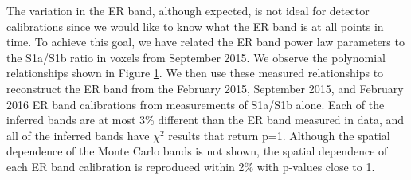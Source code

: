 The variation in the ER band, although expected, is not ideal for detector calibrations since we would like to know what the ER band is at all points in time.  To achieve this goal, we have related the ER band power law parameters to the S1a/S1b ratio in voxels from September 2015.  We observe the polynomial relationships shown in Figure \ref{ERBand_S1aS1bToER}.  We then use these measured relationships to reconstruct the ER band from the February 2015, September 2015, and February 2016 ER band calibrations from measurements of S1a/S1b alone. Each of the inferred bands are at most 3\% different than the ER band measured in data, and all of the inferred bands have $\chi^2$ results that return p=1.  Although the spatial dependence of the Monte Carlo bands is not shown, the spatial dependence of each ER band calibration is reproduced within 2\% with p-values close to 1. %

\begin{figure}[!h]
\centering
{}
\qquad
{}
\label{ERBand_S1aS1bToER}
\end{figure}

